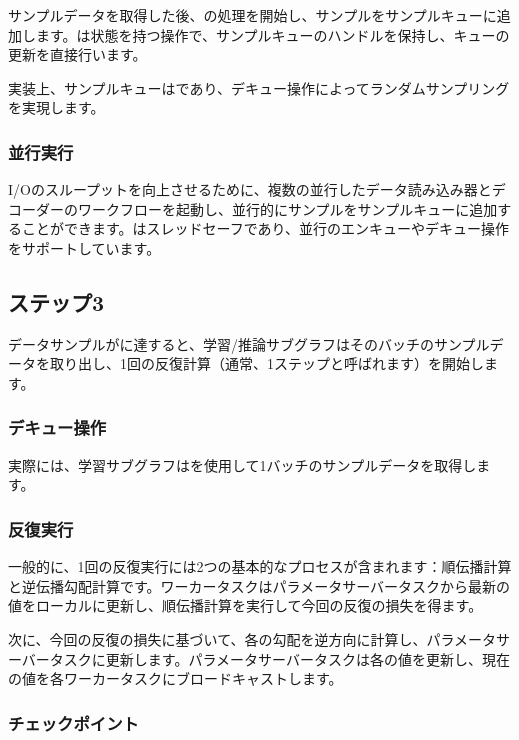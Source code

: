 \begin{content}
サンプルデータを取得した後、の処理を開始し、サンプルをサンプルキューに追加します。は状態を持つ操作で、サンプルキューのハンドルを保持し、キューの更新を直接行います。

実装上、サンプルキューはであり、デキュー操作によってランダムサンプリングを実現します。

\subsubsection{並行実行}

I/Oのスループットを向上させるために、複数の並行したデータ読み込み器とデコーダーのワークフローを起動し、並行的にサンプルをサンプルキューに追加することができます。はスレッドセーフであり、並行のエンキューやデキュー操作をサポートしています。

\subsection{ステップ3}

データサンプルがに達すると、学習/推論サブグラフはそのバッチのサンプルデータを取り出し、1回の反復計算（通常、1ステップと呼ばれます）を開始します。

\subsubsection{デキュー操作}

実際には、学習サブグラフはを使用して1バッチのサンプルデータを取得します。

\subsubsection{反復実行}

一般的に、1回の反復実行には2つの基本的なプロセスが含まれます：順伝播計算と逆伝播勾配計算です。ワーカータスクはパラメータサーバータスクから最新の値をローカルに更新し、順伝播計算を実行して今回の反復の損失を得ます。

次に、今回の反復の損失に基づいて、各の勾配を逆方向に計算し、パラメータサーバータスクに更新します。パラメータサーバータスクは各の値を更新し、現在の値を各ワーカータスクにブロードキャストします。

\subsubsection{チェックポイント}


\end{content}
